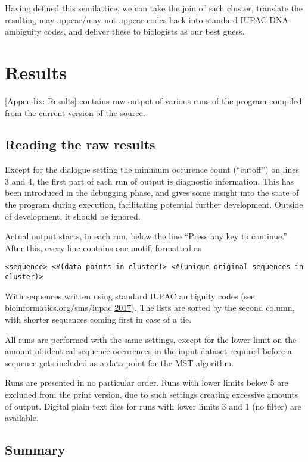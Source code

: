 \documentclass[fleqn]{book}
\begin{document}
Having defined this semilattice, we can take the join of each cluster,
translate the resulting may appear/may not appear-codes back into
standard IUPAC DNA ambiguity codes, and deliver these to biologists as
our best guess.

\chapter{Results}\label{results}

{[}Appendix: Results{]} contains raw output of various runs of the
program compiled from the current version of the source.

\section{Reading the raw results}\label{reading-the-raw-results}

Except for the dialogue setting the minimum occurence count (``cutoff'')
on lines 3 and 4, the first part of each run of output is diagnostic
information. This has been introduced in the debugging phase, and gives
some insight into the state of the program during execution,
facilitating potential further development. Outside of development, it
should be ignored.

Actual output starts, in each run, below the line ``Press any key to
continue.'' After this, every line contains one motif, formatted as

\begin{verbatim}
<sequence> <#(data points in cluster)> <#(unique original sequences in cluster)>
\end{verbatim}

With sequences written using standard IUPAC ambiguity codes (see
bioinformatics.org/sms/iupac \protect\hyperlink{ref-iupacodes}{2017}).
The lists are sorted by the second column, with shorter sequences coming
first in case of a tie.

All runs are performed with the same settings, except for the lower
limit on the amount of identical sequence occurences in the input
dataset required before a sequence gets included as a data point for the
MST algorithm.

Runs are presented in no particular order. Runs with lower limits below
5 are excluded from the print version, due to such settings creating
excessive amounts of output. Digital plain text files for runs with
lower limits 3 and 1 (no filter) are available.

\section{Summary}\label{summary}
\end{document}
